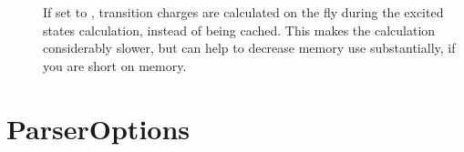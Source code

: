 \begin{description}
  \item[] If set to , transition charges are calculated
    on the fly during the excited states calculation, instead of being
    cached. This makes the calculation considerably slower, but can help to
    decrease memory use substantially, if you are short on memory.
    
  \end{description}

\section{ParserOptions}
\label{sec:dftbp.ParserOptions}

